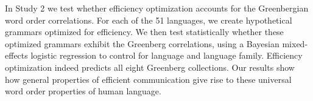\documentclass[9pt,twocolumn,twoside,lineno]{pnas-new}
\begin{document}
In Study 2 we test whether efficiency optimization accounts for the Greenbergian word order correlations.  For each of the 51 languages, we create hypothetical grammars optimized for efficiency.  We then test statistically whether these optimized grammars exhibit the Greenberg correlations, using a Bayesian mixed-effects logistic regression to control for language and language family.  Efficiency optimization indeed predicts all eight Greenberg collections.
%
Our results show how general properties of efficient communication give rise to these universal word order properties of human language.







%














\end{document}
